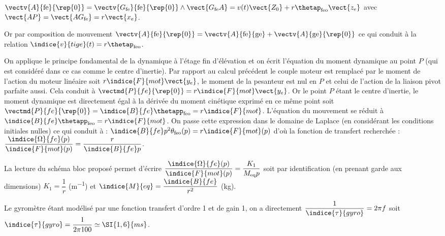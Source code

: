 \question{}
\ifprof
\begin{corrige}
$\vectv{A}{\text{fe}}{\rep{0}} =
\vectv{G_{\text{fe}}}{\text{fe}}{\rep{0}} \wedge \vect{G_{\text{fe}} A} = v(t) \vect{Z_0} + r\thetap_{\text{feo}}\vect{z_e}$ avec $\vect{AP}=\vect{AG_{\text{fe}}} = r\vect{x_e}$.

Or par composition de mouvement  
$\vectv{A}{\text{fe}}{\rep{0}}=
\vectv{A}{\text{fe}}{\text{ge}} +\vectv{A}{\text{ge}}{\rep{0}} $ ce qui conduit à la relation  $\indice{v}{tige}(t)=r\thetap_{\text{feo}}$.
\end{corrige}
\else
\fi

\question{}
\ifprof
\begin{corrige}
On applique le principe fondamental de la dynamique à l'étage fin d'élévation et on écrit l'équation du moment dynamique au point $P$ 
(qui est considéré dans ce cas comme le centre d'inertie). 
Par rapport au calcul précédent le couple moteur est remplacé par le moment de l'action du moteur linéaire soit  $r\indice{F}{mot} \vect{y_e}$, 
le moment de la pesanteur est nul en $P$ et celui de l'action de la liaison pivot parfaite aussi. 
Cela conduit à  
$\vectmd{P}{fe}{\rep{0}}=r\indice{F}{mot} \vect{y_e}$.  
Or le point $P$ étant le centre d'inertie, le moment dynamique est directement égal à la dérivée du moment cinétique exprimé en ce même point soit  $\vectmd{P}{fe}{\rep{0}} = \indice{B}{fe}\thetapp_{\text{feo}}=r\indice{F}{mot}$.
L'équation du mouvement se réduit à  $\indice{B}{fe}\thetapp_{\text{feo}}=r\indice{F}{mot}$. On passe cette expression dans le domaine de Laplace (en considérant les conditions initiales nulles) ce qui conduit à : $\indice{B}{fe} p^2 \theta_{\text{feo}}(p)=r\indice{F}{mot}(p)$ 
 d'où la fonction de transfert recherchée :  $\dfrac{\indice{\Omega}{fe}(p)}{\indice{F}{mot}(p)} = \dfrac{r}{\indice{B}{fe} p}$.

La lecture du schéma bloc proposé permet d'écrire   $\dfrac{\indice{\Omega}{fe}(p)}{\indice{F}{mot}(p)} = \dfrac{K_1}{M_{\text{eq}} p}$  soit par identification (en prenant garde aux dimensions)  $K_1 = \dfrac{1}{r}$ (\si{m^{-1}}) et  $\indice{M}{eq} = \dfrac{\indice{B}{fe}}{r^2}$ (\si{kg}).


\end{corrige}
\else
\fi

\question{}
\ifprof
\begin{corrige}
Le gyromètre étant modélisé par une fonction transfert d'ordre 1 et de gain 1, on a directement $\dfrac{1}{\indice{\tau}{gyro}}={2\pi f}$ soit $\indice{\tau}{gyro} = \dfrac{1}{2 \pi 100} \simeq \SI{1,6}{ms}$.
\end{corrige}
\else
\fi

